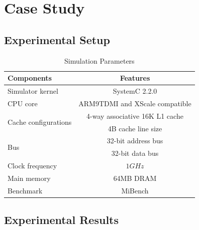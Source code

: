 \section{Case Study} \label{sec:case}


\subsection{Experimental Setup}

\begin{table}[t]
\centering
\caption{Simulation Parameters}
\label{tb:parameters}
\vspace{-5pt}
\begin{tabular}{ l | c }
\hline \hline
Components & Features\\
\hline
Simulator kernel & SystemC 2.2.0\\
\hline
CPU core & ARM9TDMI and XScale compatible \\
\hline
\multirow{2}{*}{Cache configurations} & 4-way associative 16K L1 cache  \\
& 4B cache line size \\
\hline
\multirow{2}{*}{Bus} & 32-bit address bus  \\
& 32-bit data bus \\
\hline
Clock frequency & $1GHz$ \\
\hline
Main memory & 64MB DRAM \\
\hline
Benchmark & MiBench \\
\hline\hline
\end{tabular}
\vspace{-10pt}
\end{table}

\subsection{Experimental Results}

